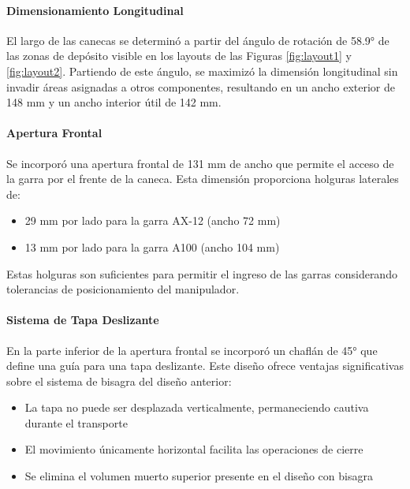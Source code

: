 \paragraph{Dimensionamiento Longitudinal}

El largo de las canecas se determinó a partir del ángulo de rotación de 58.9° de las zonas de depósito visible en los layouts de las Figuras \ref{fig:layout1} y \ref{fig:layout2}. Partiendo de este ángulo, se maximizó la dimensión longitudinal sin invadir áreas asignadas a otros componentes, resultando en un ancho exterior de 148 mm y un ancho interior útil de 142 mm.

\paragraph{Apertura Frontal}

Se incorporó una apertura frontal de 131 mm de ancho que permite el acceso de la garra por el frente de la caneca. Esta dimensión proporciona holguras laterales de:
\begin{itemize}
    \item 29 mm por lado para la garra AX-12 (ancho 72 mm)
    \item 13 mm por lado para la garra A100 (ancho 104 mm)
\end{itemize}

Estas holguras son suficientes para permitir el ingreso de las garras considerando tolerancias de posicionamiento del manipulador.

\paragraph{Sistema de Tapa Deslizante}

En la parte inferior de la apertura frontal se incorporó un chaflán de 45° que define una guía para una tapa deslizante. Este diseño ofrece ventajas significativas sobre el sistema de bisagra del diseño anterior:

\begin{itemize}
    \item La tapa no puede ser desplazada verticalmente, permaneciendo cautiva durante el transporte
    \item El movimiento únicamente horizontal facilita las operaciones de cierre
    \item Se elimina el volumen muerto superior presente en el diseño con bisagra
\end{itemize}

